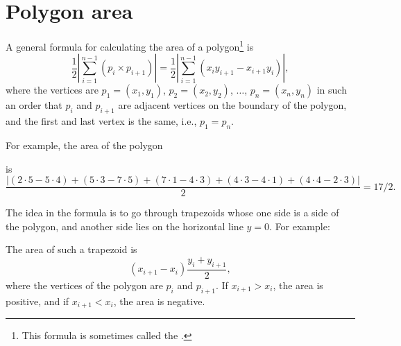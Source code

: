 \section{Polygon area}

A general formula for calculating the area
of a polygon\footnote{This formula is sometimes called the
 .} is
\[\frac{1}{2} |\sum_{i=1}^{n-1} (p_i \times p_{i+1})| =
\frac{1}{2} |\sum_{i=1}^{n-1} (x_i y_{i+1} - x_{i+1} y_i)|, \]
where the vertices are
$p_1=(x_1,y_1)$, $p_2=(x_2,y_2)$, $\ldots$, $p_n=(x_n,y_n)$
in such an order that
$p_i$ and $p_{i+1}$ are adjacent vertices on the boundary
of the polygon,
and the first and last vertex is the same, i.e., $p_1=p_n$.

For example, the area of the polygon
\begin{center}
\end{center}
is
\[\frac{|(2\cdot5-5\cdot4)+(5\cdot3-7\cdot5)+(7\cdot1-4\cdot3)+(4\cdot3-4\cdot1)+(4\cdot4-2\cdot3)|}{2} = 17/2.\]

The idea in the formula is to go through trapezoids
whose one side is a side of the polygon,
and another side lies on the horizontal line $y=0$.
For example:
\begin{center}
\end{center}
The area of such a trapezoid is
\[(x_{i+1}-x_{i}) \frac{y_i+y_{i+1}}{2},\]
where the vertices of the polygon are $p_i$ and $p_{i+1}$.
If $x_{i+1}>x_{i}$, the area is positive,
and if $x_{i+1}<x_{i}$, the area is negative.


